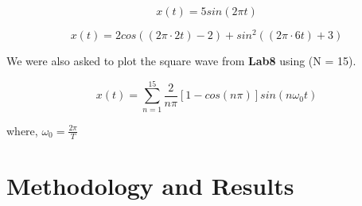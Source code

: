 \documentclass[12pt,a4paper]{article}
\begin{document}
\begin{equation}
    x(t) = 5sin(2\pi t)
\end{equation}

\begin{equation}
    x(t) = 2cos((2\pi \cdot 2t) -2) + sin^{2}((2\pi \cdot 6t) +3)
\end{equation}

We were also asked to plot the square wave from \textbf{Lab8} using (N = 15).

\begin{equation}
    x(t) = \sum_{n=1}^{15} \frac{2}{n\pi} [1-cos(n\pi)]sin(n\omega_{0}t)
\end{equation}

where, $\omega_{0} = \frac{2\pi}{T}$

\clearpage
\section{Methodology and Results}\label{sec:meth}
\end{document}
